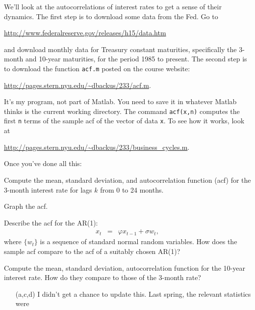 \documentclass[11pt]{exam}
\begin{document}
\begin{questions}
We'll look at the autocorrelations of interest rates to get a sense
of their dynamics.
The first step is to download some data from the Fed.
Go to

\url{http://www.federalreserve.gov/releases/h15/data.htm}

and download monthly data for Treasury constant maturities,
specifically the 3-month and 10-year maturities,
for the period 1985 to present.
The second step is to download the function
{\tt acf.m} posted on the course website:

\url{http://pages.stern.nyu.edu/~dbackus/233/acf.m}.

It's my program, not part of Matlab.
You need to save it in whatever Matlab thinks is the current working directory.
The command {\tt acf(x,n)} computes the first {\tt n} terms of
the sample acf of the vector of data {\tt x}.
To see how it works, look at

\url{http://pages.stern.nyu.edu/~dbackus/233/business_cycles.m}.

Once you've done all this:
%
\begin{parts}
\item Compute the mean, standard deviation,
and autocorrelation function (acf) for the 3-month
interest rate for lags $k$ from 0 to 24 months.

\item Graph the acf.

\item Describe the acf for the AR(1):
\begin{eqnarray*}
    x_t &=&  \varphi x_{t-1} + \sigma w_t ,
\end{eqnarray*}
where $ \{ w_t \}$ is a sequence of standard normal random variables.
How does the sample acf compare to the acf of a suitably chosen AR(1)?

\item Compute the mean, standard deviation,
autocorrelation function for the 10-year interest rate.
How do they compare to those of the 3-month rate?
\end{parts}

\begin{solution}
\begin{enumerate}
\item [(a,c,d)]
I didn't get a chance to update this.  Last spring, the relevant statistics were


\end{enumerate}
\end{solution}
\end{questions}
\end{document}
